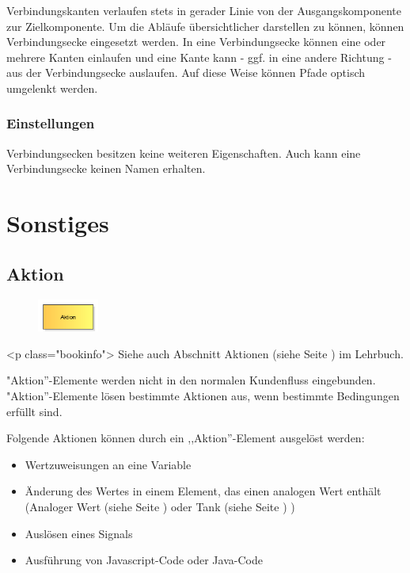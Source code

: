 Verbindungskanten verlaufen stets in gerader Linie von der Ausgangskomponente zur Zielkomponente.
Um die Abläufe übersichtlicher darstellen zu können, können Verbindungsecke eingesetzt werden. In eine Verbindungsecke können eine
oder mehrere Kanten einlaufen und eine Kante kann - ggf. in eine andere Richtung - aus der Verbindungsecke auslaufen. Auf diese Weise
können Pfade optisch umgelenkt werden.

\subsection*{Einstellungen}

Verbindungsecken besitzen keine weiteren Eigenschaften. Auch kann eine Verbindungsecke keinen Namen erhalten.





\chapter{Sonstiges}

\section{Aktion}
\label{ref:ModelElementAction}

\begin{figure}
\vspace{-22pt}
\includegraphics[width=2cm]{imageModelElementAction.png}
\vspace{-22pt}
\end{figure}

<p class="bookinfo">
Siehe auch Abschnitt Aktionen (siehe Seite \pageref{ref:book:8.12.1}) im Lehrbuch.

"Aktion''-Elemente werden nicht in den normalen Kundenfluss eingebunden.
"Aktion''-Elemente lösen bestimmte Aktionen aus, wenn bestimmte Bedingungen erfüllt sind.

Folgende Aktionen können durch ein ,,Aktion''-Element ausgelöst werden:

\begin{itemize}
  \item Wertzuweisungen an eine Variable 
  \item Änderung des Wertes in einem Element, das einen analogen Wert enthält
  (Analoger Wert (siehe Seite \pageref{ref:ModelElementAnalogValue}) oder Tank (siehe Seite \pageref{ref:ModelElementTank}) )
  \item Auslösen eines Signals 
  \item Ausführung von Javascript-Code oder Java-Code 
\end{itemize}

